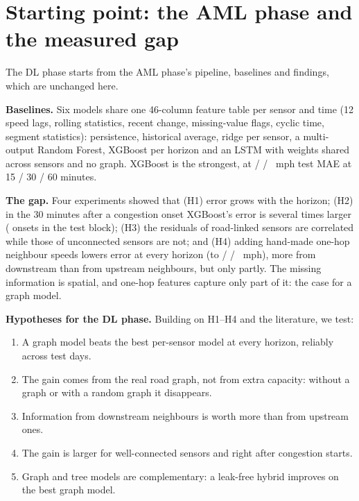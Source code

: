 \documentclass[11pt,a4paper]{article}
\newcommand{\mph}{~mph}
\begin{document}
\section{Starting point: the AML phase and the measured gap}\label{sec:aml}
The DL phase starts from the AML phase's pipeline, baselines and findings, which are unchanged here.

\textbf{Baselines.} Six models share one 46-column feature table per sensor and time (12 speed lags, rolling statistics,
recent change, missing-value flags, cyclic time, segment statistics): persistence, historical average, ridge per sensor,
a multi-output Random Forest, XGBoost per horizon and an LSTM with weights shared across sensors and no graph. XGBoost is
the strongest, at \XgbMAEFifteen{} / \XgbMAEThirty{} / \XgbMAESixty\mph{} test MAE at 15 / 30 / 60 minutes.

\textbf{The gap.} Four experiments showed that (H1) error grows with the horizon; (H2) in the 30 minutes after a
congestion onset XGBoost's error is several times larger (\TestOnsets{} onsets in the test block); (H3) the residuals of
road-linked sensors are correlated while those of unconnected sensors are not; and (H4) adding hand-made one-hop
neighbour speeds lowers error at every horizon (to \XgbNbMAEFifteen{} / \XgbNbMAEThirty{} / \XgbNbMAESixty\mph), more
from downstream than from upstream neighbours, but only partly. The missing information is spatial, and one-hop features
capture only part of it: the case for a graph model.

\textbf{Hypotheses for the DL phase.} Building on H1--H4 and the literature, we test:
\begin{enumerate}[label=\textbf{H\arabic*},start=5,leftmargin=2.6em]
\item A graph model beats the best per-sensor model at every horizon, reliably across test days.
\item The gain comes from the real road graph, not from extra capacity: without a graph or with a random graph it disappears.
\item Information from downstream neighbours is worth more than from upstream ones.
\item The gain is larger for well-connected sensors and right after congestion starts.
\item Graph and tree models are complementary: a leak-free hybrid improves on the best graph model.
\end{enumerate}
\end{document}
